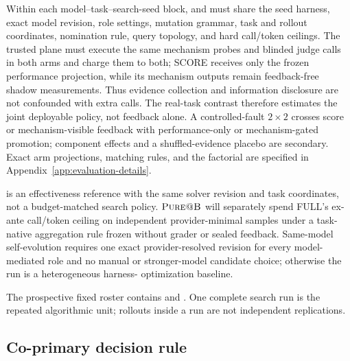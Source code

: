 Within each model--task--search-seed block, \scorearm{} and \fullarm{} must share the
seed harness, exact model revision, role settings, mutation grammar, task and
rollout coordinates, nomination rule, query topology, and hard call/token
ceilings.  The trusted plane must execute the same mechanism probes and blinded
judge calls in both arms and charge them to both; SCORE receives only the frozen
performance projection, while its mechanism outputs remain feedback-free shadow
measurements.  Thus evidence collection and information disclosure are not
confounded with extra calls.  The real-task contrast therefore estimates the joint deployable
policy, not feedback alone.  A controlled-fault \(2\times2\) crosses score or
mechanism-visible feedback with performance-only or mechanism-gated promotion;
component effects and a shuffled-evidence placebo are secondary.  Exact arm
projections, matching rules, and the factorial are specified in
Appendix~\ref{app:evaluation-details}.

\purearm{} is an effectiveness reference with the same solver revision and
task coordinates, not a budget-matched search policy.  \(\textsc{Pure@B}\)
will separately spend FULL's ex-ante call/token ceiling on independent
provider-minimal samples under a task-native aggregation rule frozen without
grader or sealed feedback.  Same-model self-evolution requires one exact
provider-resolved revision for every model-mediated role and no manual or
stronger-model candidate choice; otherwise the run is a heterogeneous harness-
optimization baseline.

The prospective fixed roster contains
 and
.
One complete search run is the repeated algorithmic unit; rollouts inside a run
are not independent replications.

\subsection{Co-primary decision rule}

